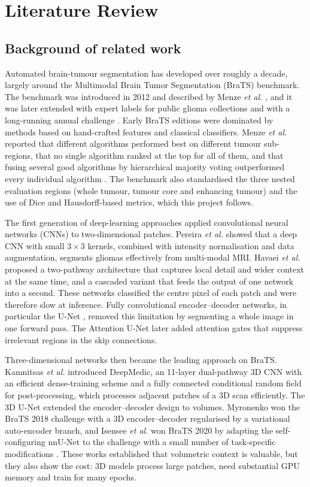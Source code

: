 \clearpage
\chapter{Literature Review}
\section{Background of related work}
Automated brain-tumour segmentation has developed over roughly a decade, largely around the Multimodal Brain Tumor Segmentation (BraTS) benchmark. The benchmark was introduced in 2012 and described by Menze \emph{et al.} \cite{menze2015}, and it was later extended with expert labels for public glioma collections \cite{bakas2017} and with a long-running annual challenge \cite{bakas2018}. Early BraTS editions were dominated by methods based on hand-crafted features and classical classifiers. Menze \emph{et al.} reported that different algorithms performed best on different tumour sub-regions, that no single algorithm ranked at the top for all of them, and that fusing several good algorithms by hierarchical majority voting outperformed every individual algorithm \cite{menze2015}. The benchmark also standardised the three nested evaluation regions (whole tumour, tumour core and enhancing tumour) and the use of Dice and Hausdorff-based metrics, which this project follows.

The first generation of deep-learning approaches applied convolutional neural networks (CNNs) to two-dimensional patches. Pereira \emph{et al.} \cite{pereira2016} showed that a deep CNN with small $3 \times 3$ kernels, combined with intensity normalisation and data augmentation, segments gliomas effectively from multi-modal MRI. Havaei \emph{et al.} \cite{havaei2017} proposed a two-pathway architecture that captures local detail and wider context at the same time, and a cascaded variant that feeds the output of one network into a second. These networks classified the centre pixel of each patch and were therefore slow at inference. Fully convolutional encoder--decoder networks, in particular the U-Net \cite{ronneberger2015}, removed this limitation by segmenting a whole image in one forward pass. The Attention U-Net \cite{oktay2018} later added attention gates that suppress irrelevant regions in the skip connections.

Three-dimensional networks then became the leading approach on BraTS. Kamnitsas \emph{et al.} \cite{kamnitsas2017} introduced DeepMedic, an 11-layer dual-pathway 3D CNN with an efficient dense-training scheme and a fully connected conditional random field for post-processing, which processes adjacent patches of a 3D scan efficiently. The 3D U-Net \cite{cicek2016} extended the encoder--decoder design to volumes. Myronenko \cite{myronenko2019} won the BraTS 2018 challenge with a 3D encoder--decoder regularised by a variational auto-encoder branch, and Isensee \emph{et al.} won BraTS 2020 by adapting the self-configuring nnU-Net \cite{isensee2021} to the challenge with a small number of task-specific modifications \cite{isensee2021brats}. These works established that volumetric context is valuable, but they also show the cost: 3D models process large patches, need substantial GPU memory and train for many epochs.

